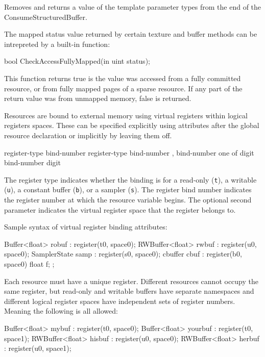 Removes and returns a value of the template parameter types from the end of the ConsumeStructuredBuffer.




The mapped status value returned by certain texture and buffer methods can be intrepreted by a built-in function:

\begin{HLSL}
  bool CheckAccessFullyMapped(in uint status);
\end{HLSL}

This function returns true is the value was accessed from a fully committed resource,
or from fully mapped pages of a sparse resource.
If any part of the return value was from unmapped memory, false is returned.


Resources are bound to external memory using virtual registers within logical registers spaces.
These can be specified explicitly using attributes after the global resource declaration
or implicitly by leaving them off.

\begin{grammar}
  \br
   register-type bind-number \terminal{)}\br
   register-type bind-number ,  bind-number \terminal{)}\br
   \textnormal{one of}\br
  \br
  \br
  digit\br
  bind-number digit\br
\end{grammar}

The register type indicates whether the binding is for a read-only (\texttt{t}), a writable (\texttt{u}),
a constant buffer (\texttt{b}), or a sampler (\texttt{s}).
The register bind number indicates the register number at which the resource variable begins.
The optional second parameter indicates the virtual register space that the register belongs to.

Sample syntax of virtual register binding attributes:
\begin{HLSL}
  Buffer<float> robuf : register(t0, space0);
  RWBuffer<float> rwbuf : register(u0, space0);
  SamplerState samp : register(s0, space0);
  cbuffer cbuf : register(b0, space0) { float f; };
\end{HLSL}

Each resource must have a unique register. Different resources cannot occupy the same register,
but read-only and writable buffers have separate namespaces and different logical register spaces have independent
sets of register numbers. Meaning the following is all allowed:
\begin{HLSL}
  Buffer<float> mybuf : register(t0, space0);
  Buffer<float> yourbuf : register(t0, space1);
  RWBuffer<float> hisbuf : register(u0, space0);
  RWBuffer<float> herbuf : register(u0, space1);
\end{HLSL}

